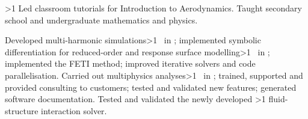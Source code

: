 \ifnum\value{npages}>1
    \vbox{
    {
        Led classroom tutorials for Introduction to Aerodynamics.
    }
    {
        Taught secondary school and undergraduate mathematics and physics.
    }
    }
\fi

\vbox{
{
    Developed multi-harmonic simulations\ifnum\value{npages}>1
        \ in \fi;
    implemented symbolic differentiation for reduced-order and response surface modelling\ifnum\value{npages}>1
        \ in \fi;
    implemented the FETI method;
    improved iterative solvers and code parallelisation.
}
{
    Carried out multiphysics analyses\ifnum\value{npages}>1
        \ in \fi;
    trained, supported and provided consulting to customers;
    tested and validated new features;
    generated software documentation.
}
{
    Tested and validated the newly developed
    \ifnum\value{npages}>1
        \else
        fluid-structure interaction
    \fi
    solver.
}
}